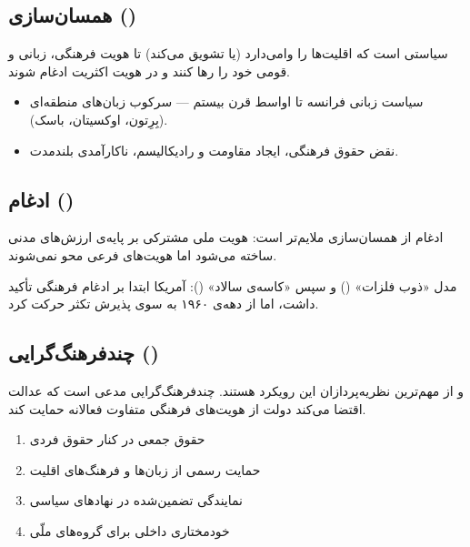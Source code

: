 \subsection{همسان‌سازی ()}

 سیاستی است که اقلیت‌ها را وا‌می‌دارد (یا تشویق می‌کند) تا هویت فرهنگی، زبانی و قومی خود را رها کنند و در هویت اکثریت ادغام شوند.

\begin{itemize}
  \item {} سیاست زبانی فرانسه تا اواسط قرن بیستم — سرکوب زبان‌های منطقه‌ای (بِرِتون، اوکسیتان، باسک).
  \item {} نقض حقوق فرهنگی، ایجاد مقاومت و رادیکالیسم، ناکارآمدی بلندمدت.
\end{itemize}

\subsection{ادغام ()}

ادغام از همسان‌سازی ملایم‌تر است: هویت ملی مشترکی بر پایه‌ی ارزش‌های مدنی ساخته می‌شود اما هویت‌های فرعی محو نمی‌شوند.

\begin{casebox}
مدل «ذوب فلزات» () و سپس «کاسه‌ی سالاد» (): آمریکا ابتدا بر ادغام فرهنگی تأکید داشت، اما از دهه‌ی ۱۹۶۰ به سوی پذیرش تکثر حرکت کرد.
\end{casebox}

\subsection{چندفرهنگ‌گرایی ()}

 و  از مهم‌ترین نظریه‌پردازان این رویکرد هستند. چندفرهنگ‌گرایی مدعی است که عدالت اقتضا می‌کند دولت از هویت‌های فرهنگی متفاوت فعالانه حمایت کند.

\begin{goldbox}
\begin{enumerate}
  \item حقوق جمعی در کنار حقوق فردی
  \item حمایت رسمی از زبان‌ها و فرهنگ‌های اقلیت
  \item نمایندگی تضمین‌شده در نهادهای سیاسی
  \item خودمختاری داخلی برای گروه‌های ملّی
\end{enumerate}
\end{goldbox}

